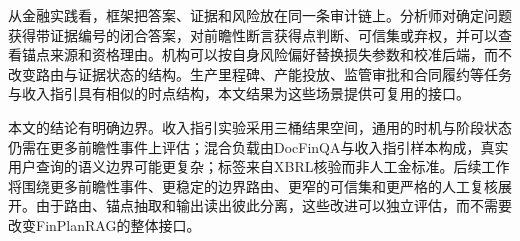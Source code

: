 从金融实践看，框架把答案、证据和风险放在同一条审计链上。分析师对确定问题获得带证据编号的闭合答案，对前瞻性断言获得点判断、可信集或弃权，并可以查看锚点来源和资格理由。机构可以按自身风险偏好替换损失参数和校准后端，而不改变路由与证据状态的结构。生产里程碑、产能投放、监管审批和合同履约等任务与收入指引具有相似的时点结构，本文结果为这些场景提供可复用的接口。

本文的结论有明确边界。收入指引实验采用三桶结果空间，通用的时机与阶段状态仍需在更多前瞻性事件上评估；混合负载由DocFinQA与收入指引样本构成，真实用户查询的语义边界可能更复杂；标签来自XBRL核验而非人工金标准。后续工作将围绕更多前瞻性事件、更稳定的边界路由、更窄的可信集和更严格的人工复核展开。由于路由、锚点抽取和输出读出彼此分离，这些改进可以独立评估，而不需要改变FinPlanRAG的整体接口。
